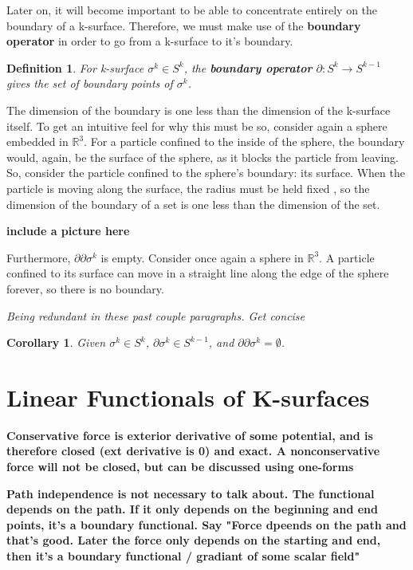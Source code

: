 \documentclass{book}
\newtheorem{defn}[equation]{Definition}
\newtheorem{coro}[equation]{Corollary}
\begin{document}
Later on, it will become important to be able to concentrate entirely on the boundary of a k-surface. Therefore, we must make use of the \textbf{boundary operator} in order to go from a k-surface to it's boundary. 

\begin{defn}
	For k-surface $\sigma^k \in S^k$, the \textbf{boundary operator} $\partial : S^k \to S^{k-1}$ gives the set of boundary points of $\sigma^k$. 
\end{defn}



The dimension of the boundary is one less than the dimension of the k-surface itself. To get an intuitive feel for why this must be so, consider again a sphere embedded in $\mathbb{R}^3$. For a particle confined to the inside of the sphere, the boundary would, again, be the surface of the sphere, as it blocks the particle from leaving. So, consider the particle confined to the sphere's boundary: its surface. When the particle is moving along the surface, the radius must be held fixed , so the dimension of the boundary of a set is one less than the dimension of the set. 

\textbf{include a picture here}


Furthermore, $\partial\partial \sigma^k$ is empty. Consider once again a sphere in $\mathbb{R}^3$. A particle confined to its surface can move in a straight line along the edge of the sphere forever, so there is no boundary. 

\emph{Being redundant in these past couple paragraphs. Get concise}

\begin{coro}
	Given $\sigma^k \in S^k$, $\partial \sigma^k \in S^{k-1}$, and $\partial\partial \sigma^k = \emptyset$. 
\end{coro}


\section{Linear Functionals of K-surfaces}
\textbf{Conservative force is exterior derivative of some potential, and is therefore closed (ext derivative is 0) and exact. A nonconservative force will not be closed, but can be discussed using one-forms}

\textbf{Path independence is not necessary to talk about. The functional depends on the path. If it only depends on the beginning and end points, it's a boundary functional. Say "Force dpeends on the path and that's good. Later the force only depends on the starting and end, then it's a boundary functional / gradiant of some scalar field"}
\end{document}
